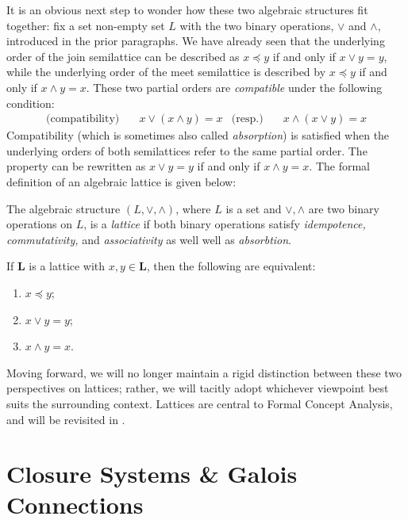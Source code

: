 It is an obvious next step to wonder how these two algebraic structures fit together: fix a set non-empty set $L$ with the two binary operations, $\vee$ and $\wedge$, introduced in the prior paragraphs. We have already seen that the underlying order of the join semilattice can be described as $x \preceq y$ if and only if $x \vee y = y$, while the underlying order of the meet semilattice is described by $x \preceq y$ if and only if $x \wedge y = x$. These two partial orders are \textit{compatible} under the following condition:
\begin{align}
     \text{(compatibility)} & \quad x \vee (x \wedge y) = x & \text{(resp.)}  & \quad x \wedge (x \vee y) = x
\end{align}
%
Compatibility (which is sometimes also called \textit{absorption}) is satisfied when the underlying orders of both semilattices refer to the same partial order. The property can be rewritten as $x \vee y = y$ if and only if $x \wedge y = x$. The formal definition of an algebraic lattice is given below:

\begin{definition}
     \label{definition:algebraic-lattice}
The algebraic structure $(L, \vee, \wedge)$, where $L$ is a set and $\vee, \wedge$ are two binary operations on $L$, is a \emph{lattice} if both binary operations satisfy \textit{idempotence, commutativity,} and \textit{associativity} as well well as \textit{absorbtion}.
\end{definition}

\begin{lemma}
  \label{lemma:the-connecting-lemma}
  If $\mathbf{L}$ is a lattice with $x, y \in \mathbf{L}$, then the following are equivalent:
  \begin{enumerate}
      \setlength\itemsep{0pt}
      \setlength\parsep{0pt}
    \item $x \preceq y$;
    \item $x \vee y = y$;
    \item $x \wedge y = x$.
  \end{enumerate}
\end{lemma}

Moving forward, we will no longer maintain a rigid distinction between these two perspectives on lattices; rather, we will tacitly adopt whichever viewpoint best suits the surrounding context. Lattices are central to Formal Concept Analysis, and will be revisited in .

\section{Closure Systems \& Galois Connections}
\label{section:closure-systems}

